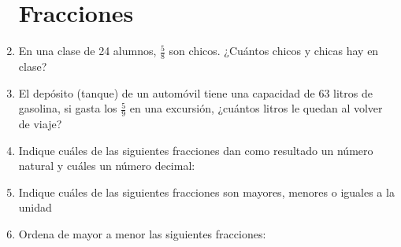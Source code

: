 \documentclass[10pt,twoside]{article}
\begin{document}
\begin{enumerate}
\section*{Fracciones}
\item En una clase de 24 alumnos, $\frac{5}{8}$ son chicos. ¿Cuántos chicos y chicas hay en clase?
\item El depósito (tanque) de un autom\'{o}vil tiene una capacidad de 63 litros de gasolina, si gasta los $\frac{5}{9}$ en una excursi\'{o}n, ¿cu\'{a}ntos litros le quedan al volver de viaje?
\item Indique cu\'{a}les de las siguientes fracciones dan como resultado un n\'{u}mero natural y cu\'{a}les un n\'{u}mero decimal:
\begin{enumerate}
\end{enumerate}
\item Indique cu\'{a}les de las siguientes fracciones son mayores, menores o iguales a la unidad
\begin{enumerate}
\end{enumerate}
\item Ordena de mayor a menor las siguientes fracciones:
\begin{enumerate}

\end{enumerate}
\end{enumerate}
\end{document}
